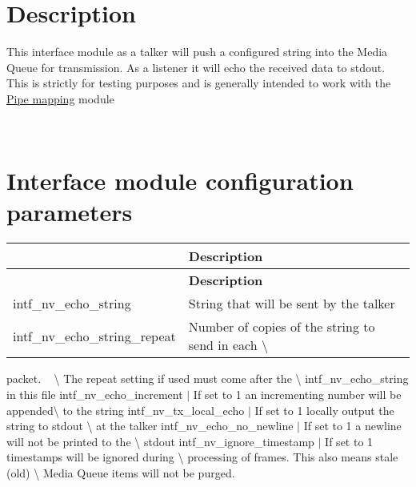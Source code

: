 \section*{Description}

This interface module as a talker will push a configured string into the Media Queue for transmission. As a listener it will echo the received data to stdout. This is strictly for testing purposes and is generally intended to work with the \hyperlink{pipe_map}{Pipe mapping} module

~\newline
 \section*{Interface module configuration parameters}

\tabulinesep=1mm
\begin{longtabu} spread 0pt [c]{*2{|X[-1]}|}
\hline
{}&{\bf Description  }\\
\endfirsthead
\hline
\endfoot
\hline
{}&{\bf Description  }\\
\endhead
intf\+\_\+nv\+\_\+echo\+\_\+string &String that will be sent by the talker \\
intf\+\_\+nv\+\_\+echo\+\_\+string\+\_\+repeat&Number of copies of the string to send in each \textbackslash{} \\
\end{longtabu}
packet. ~\newline
 \textbackslash{} The repeat setting if used must come after the \textbackslash{} intf\+\_\+nv\+\_\+echo\+\_\+string in this file intf\+\_\+nv\+\_\+echo\+\_\+increment $\vert$ If set to 1 an incrementing number will be appended\textbackslash{} to the string intf\+\_\+nv\+\_\+tx\+\_\+local\+\_\+echo $\vert$ If set to 1 locally output the string to stdout \textbackslash{} at the talker intf\+\_\+nv\+\_\+echo\+\_\+no\+\_\+newline $\vert$ If set to 1 a newline will not be printed to the \textbackslash{} stdout intf\+\_\+nv\+\_\+ignore\+\_\+timestamp $\vert$ If set to 1 timestamps will be ignored during \textbackslash{} processing of frames. This also means stale (old) \textbackslash{} Media Queue items will not be purged. 